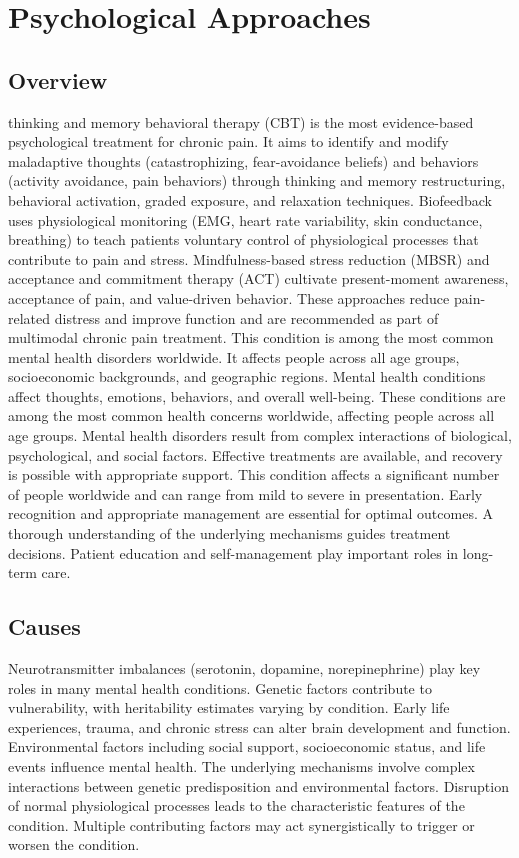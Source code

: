 \chapter{Psychological Approaches}
\label{sec:Psychological Approaches}

\section{Overview}
thinking and memory behavioral therapy (CBT) is the most evidence-based psychological treatment for chronic pain. It aims to identify and modify maladaptive thoughts (catastrophizing, fear-avoidance beliefs) and behaviors (activity avoidance, pain behaviors) through thinking and memory restructuring, behavioral activation, graded exposure, and relaxation techniques. Biofeedback uses physiological monitoring (EMG, heart rate variability, skin conductance, breathing) to teach patients voluntary control of physiological processes that contribute to pain and stress. Mindfulness-based stress reduction (MBSR) and acceptance and commitment therapy (ACT) cultivate present-moment awareness, acceptance of pain, and value-driven behavior. These approaches reduce pain-related distress and improve function and are recommended as part of multimodal chronic pain treatment. This condition is among the most common mental health disorders worldwide. It affects people across all age groups, socioeconomic backgrounds, and geographic regions. Mental health conditions affect thoughts, emotions, behaviors, and overall well-being. These conditions are among the most common health concerns worldwide, affecting people across all age groups. Mental health disorders result from complex interactions of biological, psychological, and social factors. Effective treatments are available, and recovery is possible with appropriate support. This condition affects a significant number of people worldwide and can range from mild to severe in presentation. Early recognition and appropriate management are essential for optimal outcomes. A thorough understanding of the underlying mechanisms guides treatment decisions. Patient education and self-management play important roles in long-term care.
\section{Causes}
Neurotransmitter imbalances (serotonin, dopamine, norepinephrine) play key roles in many mental health conditions. Genetic factors contribute to vulnerability, with heritability estimates varying by condition. Early life experiences, trauma, and chronic stress can alter brain development and function. Environmental factors including social support, socioeconomic status, and life events influence mental health. The underlying mechanisms involve complex interactions between genetic predisposition and environmental factors. Disruption of normal physiological processes leads to the characteristic features of the condition. Multiple contributing factors may act synergistically to trigger or worsen the condition.
